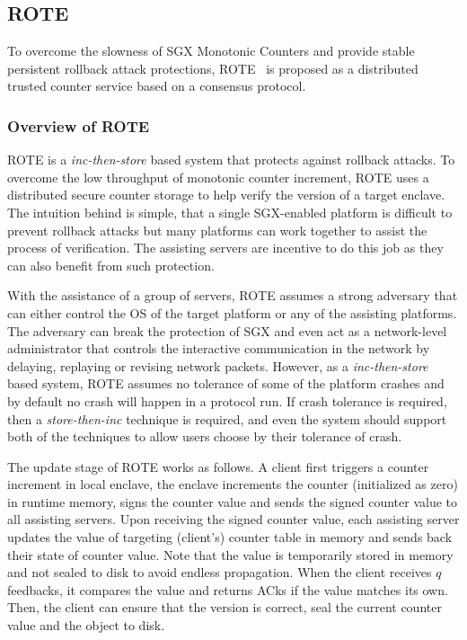 \subsection{ROTE}

To overcome the slowness of SGX Monotonic Counters and provide stable persistent 
rollback attack protections, ROTE~\cite{matetic2017rote} is proposed as a distributed trusted 
counter service based on a consensus protocol.

\subsubsection{Overview of ROTE}
\label{overview_rote}
ROTE is a \textit{inc-then-store} based system that protects against rollback attacks.
To overcome the low throughput of monotonic counter increment, ROTE uses a distributed 
secure counter storage to help verify the version of a target enclave. The intuition 
behind is simple, that a single SGX-enabled platform is difficult to prevent rollback
attacks but many platforms can work together to assist the process of verification.
The assisting servers are incentive to do this job as they can also benefit from 
such protection.

With the assistance of a group of servers, ROTE assumes a strong adversary  
that can either control the OS of the target platform or any of the assisting platforms.
The adversary can break the protection of SGX and even act as a network-level administrator
that controls the interactive communication in the network by delaying, replaying or 
revising network packets. However, as a \textit{inc-then-store} based system, ROTE 
assumes no tolerance of some of the platform crashes and by default no crash will happen
in a protocol run. If crash tolerance is required, then a \textit{store-then-inc}
technique is required, and even the system should support both of the techniques to 
allow users choose by their tolerance of crash.

The update stage of ROTE works as follows. A client first triggers a counter increment 
in local enclave, the enclave increments the counter (initialized as zero) in runtime
memory, signs the counter value and sends the signed counter value to all assisting 
servers. Upon receiving the signed counter value, each assisting server updates the 
value of targeting (client's) counter table in memory and sends back their state 
of counter value. Note that the value is temporarily stored in memory 
and not sealed to disk to avoid endless propagation. When the client receives $q$
feedbacks, it compares the value and returns ACks if the value matches its own.
Then, the client can ensure that the version is correct, seal the current counter 
value and the object to disk. 

